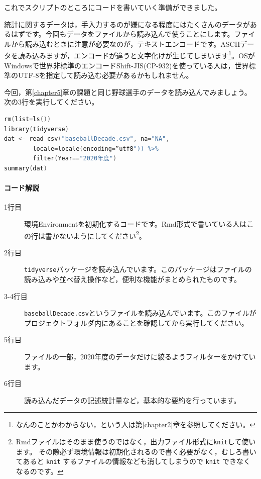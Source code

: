 \documentclass{ltjbook}
\begin{document}
これでスクリプトのところにコードを書いていく準備ができました。

統計に関するデータは，手入力するのが嫌になる程度にはたくさんのデータがあるはずです。今回もデータをファイルから読み込んで使うことにします。ファイルから読み込むときに注意が必要なのが，テキストエンコードです。ASCIIデータを読み込みますが，エンコードが違うと文字化けが生じてしまいます\footnote{なんのことかわからない，という人は第\ref{chapter2}章を参照してください。}。OSがWindowsで世界非標準のエンコードShift-JIS(CP-932)を使っている人は，世界標準のUTF-8を指定して読み込む必要があるかもしれません。

今回，第\ref{chapter5}章の課題と同じ野球選手のデータを読み込んでみましょう。次の3行を実行してください。

\begin{lstlisting}[language=c++,label={code::11_01},caption={環境の初期化とパッケージ，ファイルの読み込み}]
rm(list=ls())
library(tidyverse)
dat <- read_csv("baseballDecade.csv", na="NA", 
        locale=locale(encoding=”utf8")) %>% 
        filter(Year=="2020年度")
summary(dat)
\end{lstlisting}

\paragraph{コード解説}
\begin{description}
        \item[1行目] 環境Environmentを初期化するコードです。Rmd形式で書いている人はこの行は書かないようにしてください\footnote{Rmdファイルはそのまま使うのではなく，出力ファイル形式に\verb|knit|して使います。 その際必ず環境情報は初期化されるので書く必要がなく，むしろ書いてあると \verb|knit| するファイルの情報なども消してしまうので \verb|knit| できなくなるのです。}。
        \item[2行目] \texttt{tidyverse}パッケージを読み込んでいます。このパッケージはファイルの読み込みや並べ替え操作など，便利な機能がまとめられたものです。
        \item[3-4行目] \texttt{baseballDecade.csv}というファイルを読み込んでいます。このファイルがプロジェクトフォルダ内にあることを確認してから実行してください。
        \item[5行目] ファイルの一部，2020年度のデータだけに絞るようフィルターをかけています。
        \item[6行目] 読み込んだデータの記述統計量など，基本的な要約を行っています。
\end{description}
\end{document}
